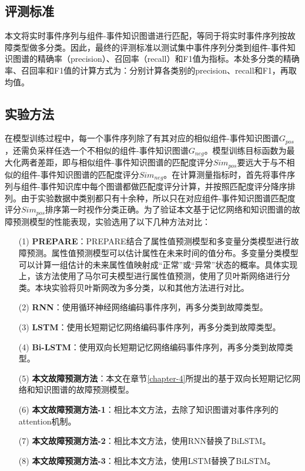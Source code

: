 \subsection{评测标准}

本文将实时事件序列与组件-事件知识图谱进行匹配，等同于将实时事件序列按故障类型做多分类。因此，最终的评测标准以测试集中事件序列分类到组件-事件知识图谱的精确率（precision）、召回率（recall）和F1值为指标。本处多分类的精确率、召回率和F1值的计算方式为：分别计算各类别的precision、recall和F1，再取均值。

\subsection{实验方法}

在模型训练过程中，每一个事件序列除了有其对应的相似组件-事件知识图谱$G_{pos}$，还需负采样任选一个不相似的组件-事件知识图谱$G_{neg}$。模型训练目标函数为最大化两者差距，即与相似组件-事件知识图谱的匹配度评分$Sim_{pos}$要远大于与不相似的组件-事件知识图谱的匹配度评分$Sim_{neg}$。在计算测量指标时，首先将事件序列与组件-事件知识库中每个图谱都做匹配度评分计算，并按照匹配度评分降序排列。由于实验数据中类别都只有十余种，所以只在对应组件-事件知识图谱匹配度评分$Sim_{pos}$排序第一时视作分类正确。为了验证本文基于记忆网络和知识图谱的故障预测模型的性能表现，实验选用了以下几种方法对比：
\begin{itemize}
    \item [(1)] 
    \textbf{PREPARE}\cite{tan2012prepare}：PREPARE结合了属性值预测模型和多变量分类模型进行故障预测。属性值预测模型可以估计属性在未来时间的值分布。多变量分类模型可以计算一组估计的未来属性值映射成“正常”或“异常”状态的概率。具体实现上，该方法使用了马尔可夫模型进行属性值预测，使用了贝叶斯网络进行分类。本块实验将贝叶斯网改为多分类，以和其他方法进行对比。
    \item [(2)]
    \textbf{RNN}\cite{xu2016health}：使用循环神经网络编码事件序列，再多分类到故障类型。
    \item [(3)]
    \textbf{LSTM}\cite{cheng2018machine,du2017deeplog,das2018desh,islam2017predicting,li2020predicting}：使用长短期记忆网络编码事件序列，再多分类到故障类型。
    \item [(4)]
    \textbf{Bi-LSTM}\cite{gao2020task}：使用双向长短期记忆网络编码事件序列，再多分类到故障类型。
    \item [(5)]
    \textbf{本文故障预测方法}：本文在章节\ref{chapter-4}所提出的基于双向长短期记忆网络和知识图谱的故障预测模型。
    \item [(6)]
    \textbf{本文故障预测方法-1}：相比本文方法，去除了知识图谱对事件序列的attention机制。
    \item [(7)]
    \textbf{本文故障预测方法-2}：相比本文方法，使用RNN替换了BiLSTM。
    \item [(8)]
    \textbf{本文故障预测方法-3}：相比本文方法，使用LSTM替换了BiLSTM。

\end{itemize}

